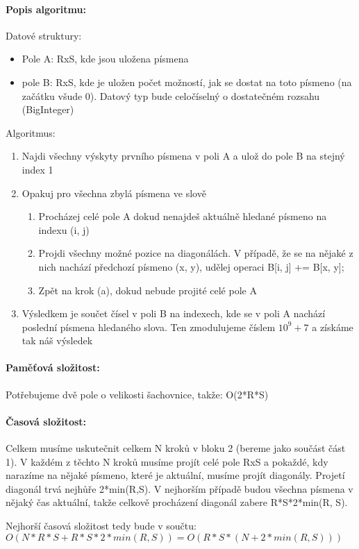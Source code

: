 \documentclass[a4paper,12pt]{article}
\begin{document}
\paragraph{Popis algoritmu:}
Datové struktury:
\begin{itemize}
   \item Pole A: RxS, kde jsou uložena písmena
   \item pole B: RxS, kde je uložen počet možností, jak se dostat na toto písmeno (na začátku všude 0). Datový typ bude celočíselný o dostatečném rozsahu (BigInteger)
\end{itemize}
Algoritmus: 
\begin{enumerate}
   \item Najdi všechny výskyty prvního písmena v poli A a ulož do pole B na stejný index 1
   \item Opakuj pro všechna zbylá písmena ve slově
   \begin{enumerate}
      \item Procházej celé pole A dokud nenajdeš aktuálně hledané písmeno na indexu (i, j)
      \item Projdi všechny možné pozice na diagonálách. V případě, že se na nějaké z nich nachází předchozí písmeno (x, y), udělej operaci B[i, j] += B[x, y];
      \item Zpět na krok (a), dokud nebude projité celé pole A
   \end{enumerate}
   \item Výsledkem je součet čísel v poli B na indexech, kde se v poli A nachází poslední písmena hledaného slova. Ten zmodulujeme číslem $10^{9} + 7$ a získáme tak náš výsledek
\end{enumerate}

\paragraph{Paměťová složitost:}
Potřebujeme dvě pole o velikosti šachovnice, takže: O(2*R*S)

\paragraph{Časová složitost:} Celkem musíme uskutečnit celkem N kroků v bloku 2 (bereme jako součást část 1). V každém z těchto N kroků musíme projít celé pole RxS a pokaždé, kdy narazíme na nějaké písmeno, které je aktuální, musíme projít diagonály. Projetí diagonál trvá nejhůře 2*min(R,S). V nejhorším případě budou všechna písmena v nějaký čas aktuální, takže celkově procházení diagonál zabere R*S*2*min(R, S).

Nejhorší časová složitost tedy bude v součtu: \\$O(N*R*S + R*S*2*min(R, S)) = O(R*S*(N+2*min(R, S)))$
\end{document}
